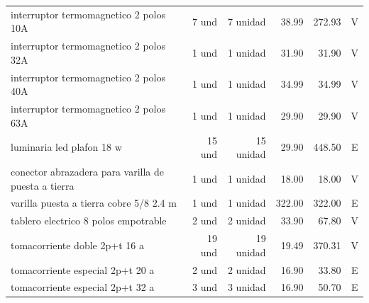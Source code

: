 \begin{longtable}{p{6.0cm}r r r r c}
interruptor termomagnetico 2 polos 10A & 7 und & 7 unidad & 38.99 & 272.93 & V \\
interruptor termomagnetico 2 polos 32A & 1 und & 1 unidad & 31.90 & 31.90 & V \\
interruptor termomagnetico 2 polos 40A & 1 und & 1 unidad & 34.99 & 34.99 & V \\
interruptor termomagnetico 2 polos 63A & 1 und & 1 unidad & 29.90 & 29.90 & V \\
luminaria led plafon 18 w & 15 und & 15 unidad & 29.90 & 448.50 & E \\
conector abrazadera para varilla de puesta a tierra & 1 und & 1 unidad & 18.00 & 18.00 & V \\
varilla puesta a tierra cobre 5/8 2.4 m & 1 und & 1 unidad & 322.00 & 322.00 & E \\
tablero electrico 8 polos empotrable & 2 und & 2 unidad & 33.90 & 67.80 & V \\
tomacorriente doble 2p+t 16 a & 19 und & 19 unidad & 19.49 & 370.31 & V \\
tomacorriente especial 2p+t 20 a & 2 und & 2 unidad & 16.90 & 33.80 & E \\
tomacorriente especial 2p+t 32 a & 3 und & 3 unidad & 16.90 & 50.70 & E \\
\bottomrule\end{longtable}\normalsize

